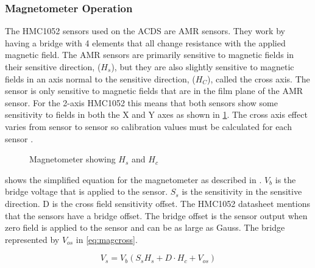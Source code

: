 \subsubsection{Magnetometer Operation}

The HMC1052 sensors used on the \ac{ACDS} are \ac{AMR} sensors. They work by having a bridge with 4 elements that all change resistance with the applied magnetic field. The \ac{AMR} sensors are primarily sensitive to magnetic fields in their sensitive direction, ($H_s$), but they are also slightly sensitive to magnetic fields in an axis normal to the sensitive direction, ($H_C$), called the cross axis. The sensor is only sensitive to magnetic fields that are in the film plane of the \ac{AMR} sensor. For the 2-axis HMC1052 this means that both sensors show some sensitivity to fields in both the X and Y axes as shown in \cref{fig:magAxisCross}. The cross axis effect varies from sensor to sensor  so calibration values must be calculated for each sensor \cite{AN215}.

\begin{figure}[H]
    \centering
    \caption{Magnetometer showing $H_s$ and $H_c$}
    \label{fig:magAxisCross}
\end{figure}

 shows the simplified equation for the magnetometer as described in \cite{AN215}. $V_b$ is the bridge voltage that is applied to the sensor. $S_s$ is the sensitivity in the sensitive direction. D is the cross field sensitivity offset. The HMC1052 datasheet\cite{HMC1052} mentions that the sensors have a bridge offset. The bridge offset is the sensor output when zero field is applied to the sensor and can be as large as  Gauss. The bridge represented by $V_{os}$ in \cref{eq:magcross}.

\begin{equation}
    V_s = V_b \left(S_s H_s + D \cdot H_c + V_{os} \right)
    \label{eq:magcross}
\end{equation}
 
